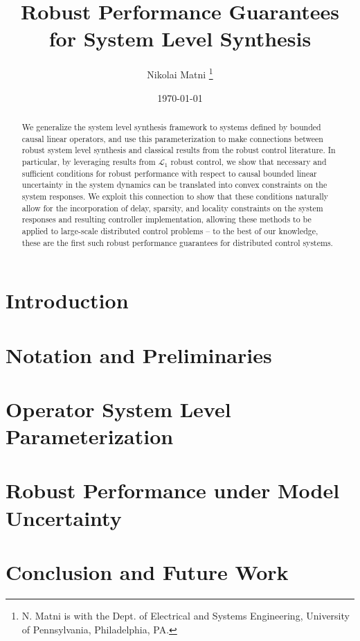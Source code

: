 \documentclass[letterpaper, 10 pt, conference]{ieeeconf}  %
\title{Robust Performance Guarantees for System Level Synthesis}
\author{Nikolai Matni
\thanks{N. Matni is with the Dept. of Electrical and Systems Engineering, University of Pennsylvania, Philadelphia, PA.}%
}
\date{\today}
\numberwithin{theorem}{section}
\numberwithin{equation}{section}
\begin{document}
\maketitle
\begin{abstract}
We generalize the system level synthesis framework to systems defined by bounded causal linear operators, and use this parameterization to make connections between robust system level synthesis and classical results from the robust control literature.  In particular, by leveraging results from $\mathcal{L}_1$ robust control, we show that necessary and sufficient conditions for robust performance with respect to causal bounded linear uncertainty in the system dynamics can be translated into convex constraints on the system responses.  We exploit this connection to show that these conditions naturally allow for the incorporation of delay, sparsity, and locality constraints on the system responses and resulting controller implementation, allowing these methods to be applied to large-scale distributed control problems -- to the best of our knowledge, these are the first such robust performance guarantees for distributed control systems.  %
\end{abstract}

\section{Introduction}
\label{sec:introduction}


\section{Notation and Preliminaries}
\label{sec:notation}


\section{Operator System Level Parameterization}
\label{sec:operator}


\section{Robust Performance under Model Uncertainty}
\label{sec:robust-perf}




\section{Conclusion and Future Work}
\label{sec:conclusion}




 
\end{document}
